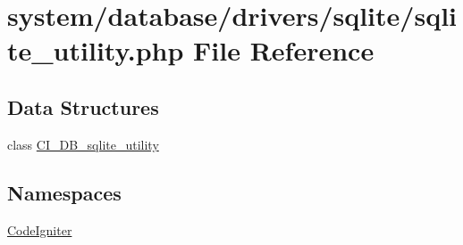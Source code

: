 \hypertarget{sqlite__utility_8php}{\section{system/database/drivers/sqlite/sqlite\-\_\-utility.php File Reference}
\label{sqlite__utility_8php}
}
\subsection*{Data Structures}
\begin{DoxyCompactItemize}
\item 
class \hyperlink{class_c_i___d_b__sqlite__utility}{C\-I\-\_\-\-D\-B\-\_\-sqlite\-\_\-utility}
\end{DoxyCompactItemize}
\subsection*{Namespaces}
\begin{DoxyCompactItemize}
\item 
\hyperlink{namespace_code_igniter}{Code\-Igniter}
\end{DoxyCompactItemize}
